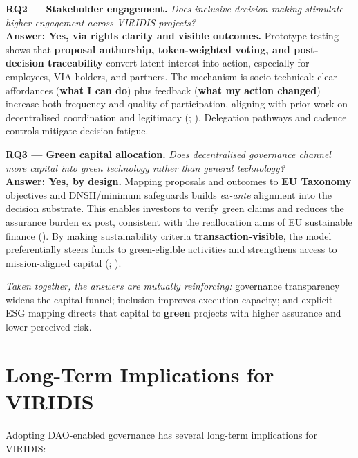 \documentclass[
  english,
  12pt,
  oneside,
  open=any]{scrbook}
\begin{document}
\textbf{RQ2 --- Stakeholder engagement.} \emph{Does inclusive
decision-making stimulate higher engagement across VIRIDIS projects?}\\
\textbf{Answer: Yes, via rights clarity and visible outcomes.} Prototype
testing shows that \textbf{proposal authorship, token-weighted voting,
and post-decision traceability} convert latent interest into action,
especially for employees, VIA holders, and partners. The mechanism is
socio-technical: clear affordances (\textbf{what I can do}) plus
feedback (\textbf{what my action changed}) increase both frequency and
quality of participation, aligning with prior work on decentralised
coordination and legitimacy
(;
).
Delegation pathways and cadence controls mitigate decision fatigue.

\textbf{RQ3 --- Green capital allocation.} \emph{Does decentralised
governance channel more capital into green technology rather than
general technology?}\\
\textbf{Answer: Yes, by design.} Mapping proposals and outcomes to
\textbf{EU Taxonomy} objectives and DNSH/minimum safeguards builds
\emph{ex-ante} alignment into the decision substrate. This enables
investors to verify green claims and reduces the assurance burden ex
post, consistent with the reallocation aims of EU sustainable finance
(). By making sustainability criteria \textbf{transaction-visible},
the model preferentially steers funds to green-eligible activities and
strengthens access to mission-aligned capital
(;
).

\emph{Taken together, the answers are mutually reinforcing:} governance
transparency widens the capital funnel; inclusion improves execution
capacity; and explicit ESG mapping directs that capital to
\textbf{green} projects with higher assurance and lower perceived risk.

\section{Long-Term Implications for
VIRIDIS}\label{long-term-implications-for-viridis}

Adopting DAO-enabled governance has several long-term implications for
VIRIDIS:
\end{document}
